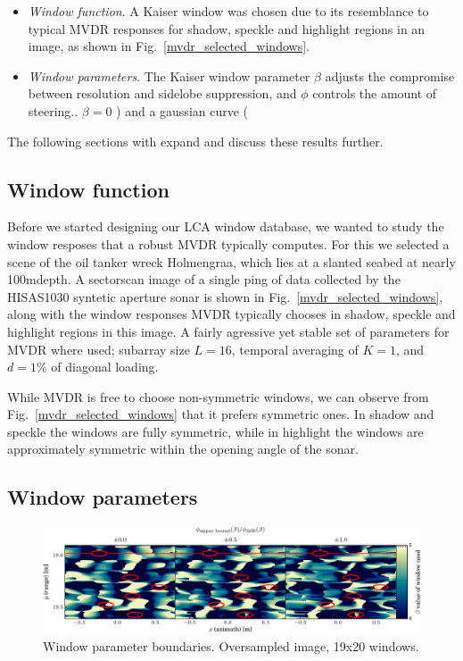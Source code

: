 \documentclass[10pt,journal,draftclsnofoot,onecolumn]{IEEEtran}
\let\MYoriglatexcaption\caption               %
\renewcommand{\caption}[2][\relax]{\MYoriglatexcaption[#2]{#2}}
\newcommand\Fig[1]{Fig.~\ref{#1}}
\newcommand\1{\vec 1}
\begin{document}
\begin{itemize}
\item \emph{Window function}. A Kaiser window was chosen due to its resemblance to typical MVDR responses for shadow, speckle and highlight regions in an image, as shown in \Fig{mvdr_selected_windows}.
\item \emph{Window parameters}. The Kaiser window parameter $\beta$ adjusts the compromise between resolution and sidelobe suppression, and $\phi$ controls the amount of steering.. $\beta=0$ ) and a gaussian curve (
\end{itemize}

The following sections with expand and discuss these results further.

\subsection{Window function}

Before we started designing our LCA window database, we wanted to study the window resposes that a robust MVDR typically computes. For this we selected a scene of the oil tanker wreck Holmengraa, which lies at a slanted seabed at nearly 100m\;depth. A sectorscan image of a single ping of data collected by the HISAS1030 syntetic aperture sonar is shown in \Fig{mvdr_selected_windows}, along with the window responses MVDR typically chooses in shadow, speckle and highlight regions in this image. A fairly agressive yet stable set of parameters for MVDR where used; subarray size $L=16$, temporal averaging of $K=1$, and $d=1\%$ of diagonal loading.

While MVDR is free to choose non-symmetric windows, we can observe from \Fig{mvdr_selected_windows} that it prefers symmetric ones. In shadow and speckle the windows are fully symmetric, while in highlight the windows are approximately symmetric within the opening angle of the sonar. 


\subsection{Window parameters}





\begin{figure}[tbhp!]%
\includegraphics[width=.2\textwidth]{gfx/oversampling_mosaic_bounds_lca_windows_beta.pdf}%
\caption{Window parameter boundaries. Oversampled image, 19x20 windows.}\label{oversampling_mosaic_bounds}
\end{figure}
\end{document}
